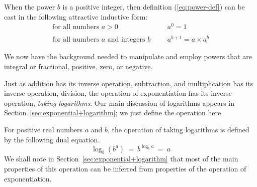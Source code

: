 When the power $b$ is a positive integer, then definition (\ref{eq:power-def}) can be cast in the following attractive inductive form:
\begin{equation}
\label{eq:power-def-integer}
\begin{array}{llll}
\mbox{for all numbers $a>0$} & & & a^0 = 1 \\
 & & & \\
\mbox{for all numbers $a$ and integers $b$} & & & a^{b+1} = a \times a^b
\end{array}
\end{equation}

\medskip

We now have the background needed to manipulate and employ powers that are integral or fractional, positive, zero, or negative.

\bigskip

\noindent {}

\bigskip

\noindent
Just as addition has its inverse operation, subtraction, and multiplication has its inverse operation, division, the operation of exponentiation has its inverse operation, {\it taking logarithms}.  Our main discussion of logarithms appears in Section~\ref{sec:exponential+logarithm}; we just define the operation here.

\medskip


For positive real numbers $a$ and $b$, the operation of taking logarithms is defined by the following dual equation.
\[ \log_b (b^a) \ = \ b^{\log_b a} \ = \ a \]
We shall note in Section~\ref{sec:exponential+logarithm} that most of the main properties of this operation can be inferred from properties of the operation of exponentiation.

